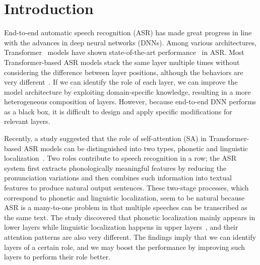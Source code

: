 \section{Introduction}\label{sec:intro}

End-to-end automatic speech recognition (ASR) has made great progress in line with the advances in deep neural networks (DNNs).
Among various architectures, Transformer~\cite{transformer} models have shown state-of-the-art performance~\cite{transformer-transducer, conformer, pushing, pushing-semi, speechstew} in ASR.
Most Transformer-based ASR models stack the same layer multiple times without considering the difference between layer positions, although the behaviors are very different~\cite{yang20i, usefulness, stochastic}.
If we can identify the role of each layer, we can improve the model architecture by exploiting domain-specific knowledge, resulting in a more heterogeneous composition of layers.
However, because end-to-end DNN performs as a black box, it is difficult to design and apply specific modifications for relevant layers.

Recently, a study suggested that the role of self-attention (SA) in Transformer-based ASR models can be distinguished into two types, phonetic and linguistic localization~\cite{understanding}.
Two roles contribute to speech recognition in a row; the ASR system first extracts phonologically meaningful features by reducing the pronunciation variations and then combines such information into textual features to produce natural output sentences.
These two-stage processes, which correspond to phonetic and linguistic localization, seem to be natural because ASR is a many-to-one problem in that multiple speeches can be transcribed as the same text.
The study discovered that phonetic localization mainly appears in lower layers while linguistic localization happens in upper layers~\cite{understanding}, and their attention patterns are also very different.
The findings imply that we can identify layers of a certain role, and we may boost the performance by improving such layers to perform their role better.

